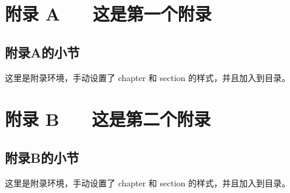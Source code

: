 \documentclass{shnuthesis}
\begin{document}

\appendix
\backmatter %

\chapter{附录 A ~~ 这是第一个附录}
\renewcommand{\thesection}{A.\arabic{section}}
\section{附录A的小节}
这里是附录环境，手动设置了 chapter 和 section 的样式，并且加入到目录。

\chapter{附录 B ~~ 这是第二个附录}
\renewcommand{\thesection}{B.\arabic{section}}
\section{附录B的小节}
这里是附录环境，手动设置了 chapter 和 section 的样式，并且加入到目录。

	
\end{document}
